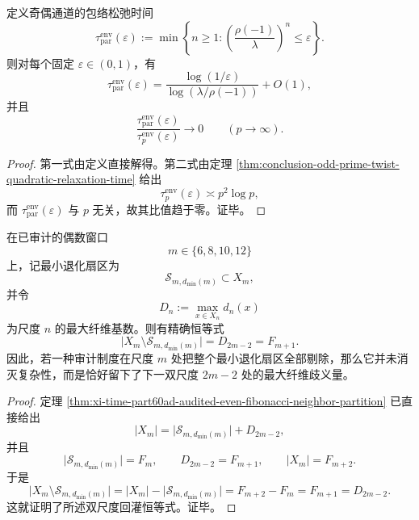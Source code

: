 \begin{corollary}[奇偶通道与奇素数通道的时间尺度裂解]\label{cor:conclusion-parity-versus-odd-prime-time-scale-splitting}
定义奇偶通道的包络松弛时间
\[
\tau_{\mathrm{par}}^{\mathrm{env}}(\varepsilon)
:=
\min\left\{n\ge 1:\left(\frac{\rho(-1)}{\lambda}\right)^n\le \varepsilon\right\}.
\]
则对每个固定 \(\varepsilon\in(0,1)\)，有
\[
\tau_{\mathrm{par}}^{\mathrm{env}}(\varepsilon)
=
\frac{\log(1/\varepsilon)}{\log(\lambda/\rho(-1))}+O(1),
\]
并且
\[
\frac{\tau_{\mathrm{par}}^{\mathrm{env}}(\varepsilon)}{\tau_p^{\mathrm{env}}(\varepsilon)}
\longrightarrow 0
\qquad (p\to\infty).
\]
\end{corollary}
\begin{proof}
第一式由定义直接解得。第二式由定理 \ref{thm:conclusion-odd-prime-twist-quadratic-relaxation-time} 给出
\[
\tau_p^{\mathrm{env}}(\varepsilon)\asymp p^2\log p,
\]
而 \(\tau_{\mathrm{par}}^{\mathrm{env}}(\varepsilon)\) 与 \(p\) 无关，故其比值趋于零。证毕。
\end{proof}

\begin{theorem}[最小退化剔除的双尺度回灌律]\label{thm:conclusion-minsector-doublescale-feedback-law}
在已审计的偶数窗口
\[
m\in\{6,8,10,12\}
\]
上，记最小退化扇区为
\[
\mathcal S_{m,d_{\min}(m)}\subset X_m,
\]
并令
\[
D_n:=\max_{x\in X_n}d_n(x)
\]
为尺度 \(n\) 的最大纤维基数。则有精确恒等式
\[
\bigl|X_m\setminus \mathcal S_{m,d_{\min}(m)}\bigr|
=
D_{2m-2}
=
F_{m+1}.
\]
因此，若一种审计制度在尺度 \(m\) 处把整个最小退化扇区全部剔除，那么它并未消灭复杂性，而是恰好留下了下一双尺度 \(2m-2\) 处的最大纤维歧义量。
\end{theorem}
\begin{proof}
定理 \ref{thm:xi-time-part60ad-audited-even-fibonacci-neighbor-partition} 已直接给出
\[
|X_m|
=
\bigl|\mathcal S_{m,d_{\min}(m)}\bigr|+D_{2m-2},
\]
并且
\[
\bigl|\mathcal S_{m,d_{\min}(m)}\bigr|=F_m,
\qquad
D_{2m-2}=F_{m+1},
\qquad
|X_m|=F_{m+2}.
\]
于是
\[
\bigl|X_m\setminus \mathcal S_{m,d_{\min}(m)}\bigr|
=
|X_m|-\bigl|\mathcal S_{m,d_{\min}(m)}\bigr|
=
F_{m+2}-F_m
=
F_{m+1}
=
D_{2m-2}.
\]
这就证明了所述双尺度回灌恒等式。证毕。
\end{proof}


